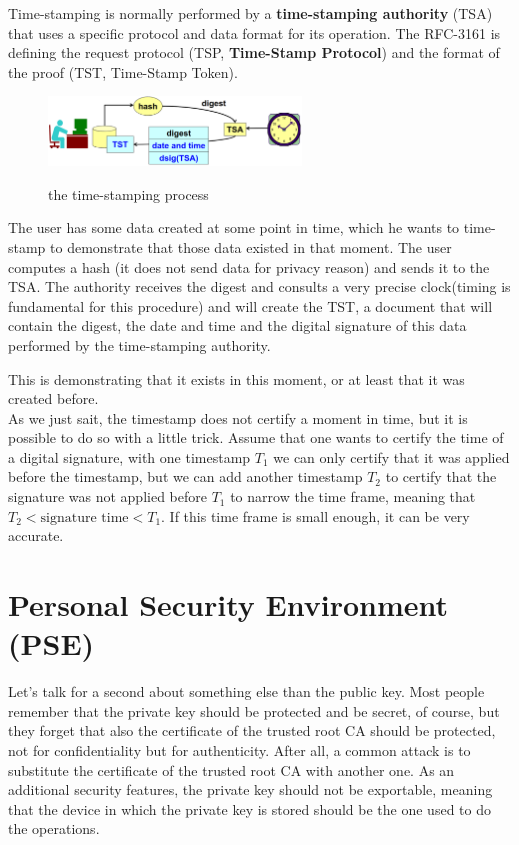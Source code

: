 Time-stamping is normally performed by a \textbf{time-stamping
authority} (TSA) that uses a specific protocol and data format for its
operation. The RFC-3161 is defining the request protocol (TSP,
\textbf{Time-Stamp Protocol}) and the format of the proof (TST,
Time-Stamp Token).

\begin{figure}[H]
  \centering
  \includegraphics[width=0.6\textwidth]{img/x509 time stamping.png}
  \label{fig:time-stamping}

  \caption{the time-stamping process}
\end{figure}

The user has some data created at some point in time, which he wants
to time-stamp to demonstrate that those data existed in that moment.
The user computes a hash (it does not send data for privacy reason)
and sends it to the TSA. The authority receives the digest and
consults a very precise clock(timing is fundamental for this
procedure) and will create the TST, a document that will contain the
digest, the date and time and the digital signature of this data
performed by the time-stamping authority.

This is demonstrating that it exists in this moment, or at least that
it was created before.\\

As we just sait, the timestamp does not certify a moment in time, but
it is possible to do so with a little trick. Assume that one wants to
certify the time of a digital signature, with one timestamp $T_1$ we can
only certify that it was applied before the timestamp, but we can 
add another timestamp $T_2$ to certify that the signature was not
applied before $T_1$ to narrow the time frame, meaning that $T_2 <
\text{signature time} < T_1$. If this time frame is small enough, it
can be very accurate.

\section{Personal Security Environment (PSE)}
Let's talk for a second about something else than the public key. Most
people remember that the private key should be protected and be
secret, of course, but they forget that also the certificate of the
trusted root CA should be protected, not for confidentiality but for
authenticity. After all, a common attack is to substitute the
certificate of the trusted root CA with another one. As an additional
security features, the private key should not be exportable, meaning
that the device in which the private key is stored should be the one
used to do the operations.\\

